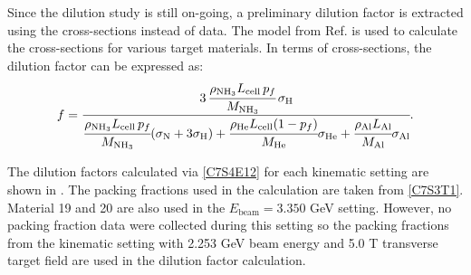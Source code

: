 Since the dilution study is still on-going, a preliminary dilution factor is extracted using the cross-sections instead of data. The model from Ref. \cite{Bosted2008} is used to calculate the cross-sections for various target materials. In terms of cross-sections, the dilution factor can be expressed as:
\begin{equation} \label{C7S4E12}
f = \cfrac{3\,\cfrac{\rho_{\mathrm{NH_3}}L_{\mathrm{cell}}\,p_f}{M_{\mathrm{NH_3}}}\,\sigma_{\mathrm{H}}}{\cfrac{\rho_{\mathrm{NH_3}}L_{\mathrm{cell}}\,p_f}{M_{\mathrm{NH_3}}}(\sigma_{\mathrm{N}}+3\sigma_{\mathrm{H}})+\cfrac{\rho_{\mathrm{He}}L_{\mathrm{cell}}(1-p_f)}{M_{\mathrm{He}}}\sigma_{\mathrm{He}}+\cfrac{\rho_{\mathrm{Al}}L_{\mathrm{Al}}}{M_{\mathrm{Al}}}\sigma_{\mathrm{Al}}}.
\end{equation}

The dilution factors calculated via \cref{C7S4E12} for each kinematic setting are shown in . The packing fractions used in the calculation are taken from \cref{C7S3T1}. Material 19 and 20 are also used in the $E_{\mathrm{beam}}=3.350$ GeV setting. However, no packing fraction data were collected during this setting so the packing fractions from the kinematic setting with 2.253 GeV beam energy and 5.0 T transverse target field are used in the dilution factor calculation.

